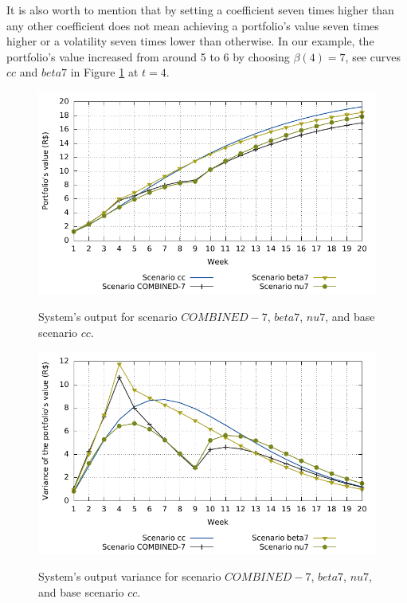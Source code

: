 It is also worth to mention that by setting a coefficient seven times higher than any other coefficient does not mean achieving a portfolio's value seven times higher or a volatility seven times lower than otherwise.
In our example, the portfolio's value increased from around 5 to 6 by choosing $\beta(4)=7$, see curves $cc$ and $beta7$ in Figure \ref{fig:y_spec1} at $t=4$.

%
\begin{figure} [H]
	\caption{System's output for scenario $COMBINED-7$, $beta7$, $nu7$, and base scenario $cc$.}
	\centering
	\includegraphics[width=5.9in,keepaspectratio]{figures/y_spec1}
	\label{fig:y_spec1}
\end{figure}
%
\begin{figure} [H]
	\caption{System's output variance for scenario $COMBINED-7$, $beta7$, $nu7$, and base scenario $cc$.}
	\centering
	\includegraphics[width=5.9in,keepaspectratio]{figures/var_spec1}
	\label{fig:var_spec1}
\end{figure}


